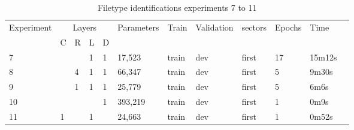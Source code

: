 \begin{table}[!ht]
    \centering
    \caption{Filetype identifications experiments 7 to 11}
    \label{tab:carving7-11}
\begin{tabular}{|l|l|l|l|l|l|l|l|l|l|l|l|}
\hline
Experiment & \multicolumn{4}{c|}{Layers}                                                                       & Parameters            & Train                 & Validation            & sectors               & Epochs & Time    \\ \cline{2-5}
   & C & R & \multicolumn{1}{l|}{L} & \multicolumn{1}{l|}{D} & \multicolumn{1}{l|}{} & \multicolumn{1}{l|}{} & \multicolumn{1}{l|}{} & \multicolumn{1}{l|}{} &        &         \\ \hline
7  &   &    & 1 & 1 & 17,523  & train & dev & first & 17  & 15m12s \\ \hline
8  &   &  4 & 1 & 1 & 66,347  & train & dev & first & 5   & 9m30s  \\ \hline
9  &   &  1 & 1 & 1 & 25,779  & train & dev & first & 5   & 6m6s   \\ \hline
10 &   &    &   & 1 & 393,219 & train & dev & first & 1   & 0m9s   \\ \hline
11 & 1 &    & 1 &   & 24,663  & train & dev & first & 1   & 0m52s  \\ \hline
\end{tabular}
\end{table}